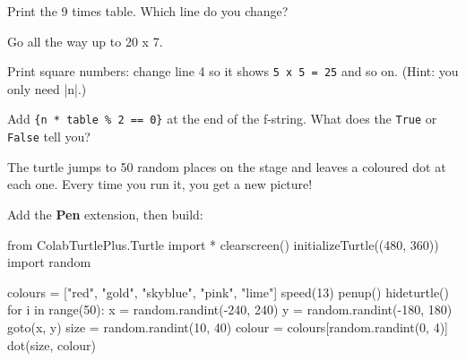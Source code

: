 \begin{challenge}
\tick Print the 9 times table. Which line do you change?\par
\tick Go all the way up to 20 x 7.\par
\tick Print square numbers: change line 4 so it shows \texttt{5 x 5 = 25} and so on. (Hint: you only need \py|n|.)\par
\tick Add \texttt{\{n * table \% 2 == 0\}} at the end of the f-string. What does the \texttt{True} or \texttt{False} tell you?
\end{challenge}


The turtle jumps to 50 random places on the stage and leaves a coloured dot at each one. Every time you run it, you get a new picture!

Add the \textbf{Pen} extension, then build:

\begin{center}
\begin{scratch}
\end{scratch}
\end{center}


\begin{typethis}
from ColabTurtlePlus.Turtle import *
clearscreen()
initializeTurtle((480, 360))
import random

colours = ["red", "gold", "skyblue", "pink", "lime"]
speed(13)
penup()
hideturtle()
for i in range(50):
    x = random.randint(-240, 240)
    y = random.randint(-180, 180)
    goto(x, y)
    size = random.randint(10, 40)
    colour = colours[random.randint(0, 4)]
    dot(size, colour)
\end{typethis}


